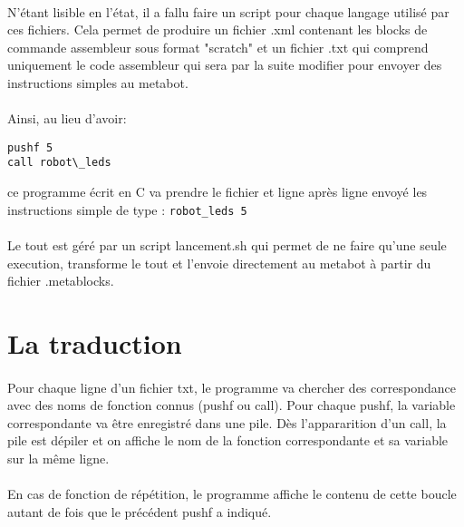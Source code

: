\documentclass[10pt,a4paper]{report}
\begin{document}
\paragraph{}
N'étant lisible en l'état, il a fallu faire un script pour chaque langage utilisé par ces fichiers. Cela permet de produire un fichier .xml contenant les blocks de commande assembleur sous format "scratch" et un fichier .txt qui comprend uniquement le code assembleur qui sera par la suite modifier pour envoyer des instructions simples au metabot.

\paragraph{}

Ainsi, au lieu d'avoir:
\begin{verbatim} 
pushf 5 
call robot\_leds
\end{verbatim} 
ce programme écrit en C va prendre le fichier et ligne après ligne envoyé les instructions simple de type : 
\texttt{robot\_leds 5}
\paragraph{}
Le tout est géré par un script lancement.sh qui permet de ne faire qu'une seule execution, transforme le tout et l'envoie directement au metabot à partir du fichier .metablocks.

\paragraph{}
\section{La traduction}
\paragraph{}
Pour chaque ligne d'un fichier txt, le programme va chercher des correspondance avec des noms de fonction connus (pushf ou call). Pour chaque pushf, la variable correspondante va être enregistré dans une pile. Dès l'appararition d'un call, la pile est dépiler et on affiche le nom de la fonction correspondante et sa variable sur la même ligne.
\paragraph{}
En cas de fonction de répétition, le programme affiche le contenu de cette boucle autant de fois que le précédent pushf a indiqué.
\end{document}
